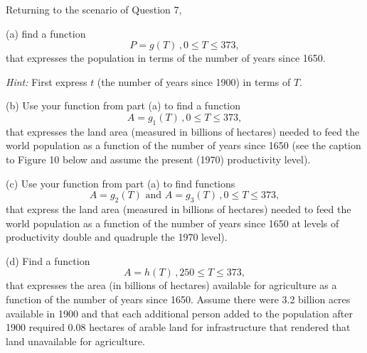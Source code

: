 \documentclass{ximera}
\begin{document}
\begin{question}   \label{Q10:ExponentialG}
Returning to the scenario of Question 7, 

(a) find a function
\[
    P = g(T) \, , 0\leq T \leq 373 ,
\]
that expresses the population in terms of the number of years since 1650. 

{\it Hint:} First express $t$ (the number of years since 1900) in terms of $T$.

(b) Use your function from part (a) to find a function
\[
  A = g_1(T) \, , 0\leq T \leq 373 ,
\]
that expresses the land area (measured in billions of hectares) needed to feed the world population as a function of the number of years since 1650 (see the caption to Figure 10 below and assume the present (1970) productivity level).

(c) Use your function from part (a) to find functions
\[
  A = g_2(T)  \text{ and } A = g_3(T)\, , 0\leq T \leq 373 ,
\]
that express the land area (measured in billions of hectares) needed to feed the world population as a function of the number of years since 1650 at levels of productivity double and quadruple the 1970 level).

(d) Find a function
\[
    A = h(T) \, , 250\leq T \leq 373 ,
\]
that expresses the area (in billions of hectares) available for agriculture as a function of the number of years since 1650. Assume there were 3.2 billion acres available in 1900 and that each additional person added to the population after 1900 required 0.08 hectares of arable land for infrastructure that rendered that land unavailable for agriculture.

 
\begin{onlineOnly}
    \begin{center}
\end{center}
\end{onlineOnly}


\end{question}
\end{document}
